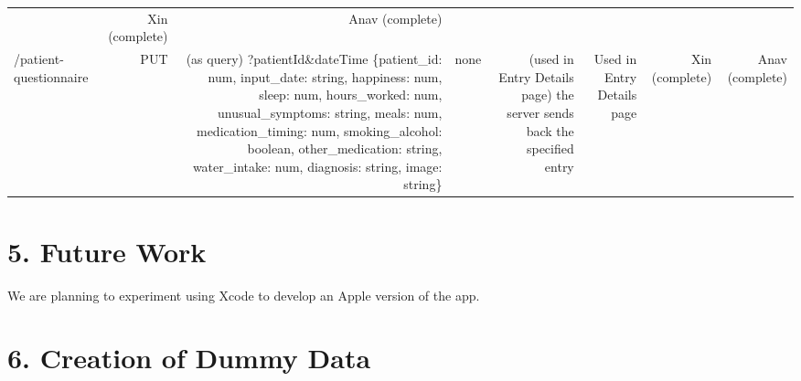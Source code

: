 \documentclass[]{book}
\begin{document}
\begin{longtable}[]{@{}lrrcrrrr@{}}
\begin{minipage}[t]{0.06\columnwidth}
\end{minipage} & \begin{minipage}[t]{0.06\columnwidth}\raggedleft
Xin (complete)\strut
\end{minipage} & \begin{minipage}[t]{0.06\columnwidth}\raggedleft
Anav (complete)\strut
\end{minipage}\tabularnewline
\begin{minipage}[t]{0.13\columnwidth}\raggedright
/patient-questionnaire\strut
\end{minipage} & \begin{minipage}[t]{0.14\columnwidth}\raggedleft
PUT\strut
\end{minipage} & \begin{minipage}[t]{0.14\columnwidth}\raggedleft
(as query) ?patientId\&dateTime \{patient\_id: num, input\_date: string, happiness: num, sleep: num, hours\_worked: num, unusual\_symptoms: string, meals: num, medication\_timing: num, smoking\_alcohol: boolean, other\_medication: string, water\_intake: num, diagnosis: string, image: string\}\strut
\end{minipage} & \begin{minipage}[t]{0.15\columnwidth}\centering
none\strut
\end{minipage} & \begin{minipage}[t]{0.06\columnwidth}\raggedleft
(used in Entry Details page) the server sends back the specified entry\strut
\end{minipage} & \begin{minipage}[t]{0.06\columnwidth}\raggedleft
Used in Entry Details page\strut
\end{minipage} & \begin{minipage}[t]{0.06\columnwidth}\raggedleft
Xin (complete)\strut
\end{minipage} & \begin{minipage}[t]{0.06\columnwidth}\raggedleft
Anav (complete)\strut
\end{minipage}\tabularnewline
\bottomrule
\end{longtable}

\hypertarget{future-work}{%
\section{5. Future Work}\label{future-work}}

We are planning to experiment using Xcode to develop an Apple version of the app.

\hypertarget{creation-of-dummy-data}{%
\section{6. Creation of Dummy Data}\label{creation-of-dummy-data}}
\end{document}
